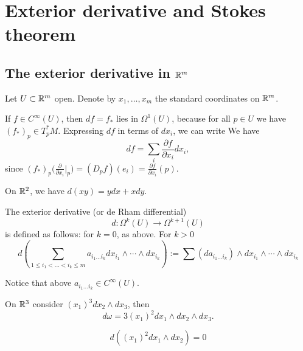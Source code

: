\setcounter{chapter}{5}
\chapter{Exterior derivative and Stokes theorem}

\section{The exterior derivative in $\mathbb{R}^m$}

Let $U \subset \mathbb{R}^m$ open. Denote by $x_1,\dots,x_m$ the  standard coordinates on $\mathbb{R}^m$.

\begin{remark}
    If $f \in C^{\infty}(U)$, then $df = f_*$ lies in $\Omega^{1}(U)$,  because for all $p \in U$ we have $(f_*)_p \in T_p^{*} M$. 
    Expressing $df$ in terms of $dx_i$, we can write
    We have $$df = \sum_i \frac{\partial f}{\partial x_i}  dx_{i},$$ since
 $       (f_*)_p\Big( \frac{\partial }{\partial x_i}\Big|_p \Big)  = (D_pf)(e_i)=\frac{\partial f}{\partial x_i} (p)$.
\end{remark}
\begin{eg} On $\mathbb{R}^2$, we have
    $d(xy) = ydx + xdy$.
\end{eg}
\begin{definition}
The exterior derivative (or de Rham differential)       
       $$ d: \Omega^{k}(U) \longrightarrow \Omega^{k+1}(U) $$
is defined as follows: for $k=0$,  as above. For $k>0$ 
$$d\left( \sum_{1 \le i_1 <  \ldots < i_k\le m } a_{i_1 \ldots  i_k}dx_{i_1} \wedge \cdots \wedge dx_{i_k}\right):=\sum (d a_{i_1 \ldots  i_k}) \wedge dx_{i_1} \wedge \cdots \wedge dx_{i_k}
$$
\end{definition}
Notice that above $a_{i_1 \ldots  i_k}\in  C^{\infty}(U)$.
\begin{eg} On $\mathbb{R}^3$
    consider $(x_1)^3 dx_{2} \wedge dx_{3}$, then
    \[
        d\omega = 3 (x_{1})^2 dx_1 \wedge dx_2 \wedge dx_3
    .\] 
\end{eg}
\begin{eg}
    \[
        d((x_{1})^2 dx_1 \wedge dx_2)= 0
    \] \end{eg}

